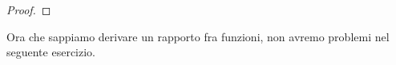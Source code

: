 \begin{proof}
% 
\end{proof}
Ora che sappiamo derivare un rapporto fra funzioni, non avremo 
problemi nel seguente esercizio.

